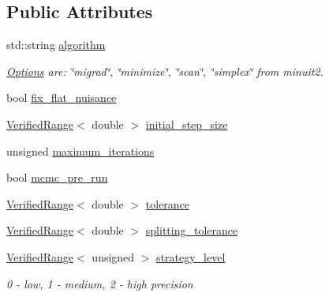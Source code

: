 \subsection*{Public Attributes}
\begin{DoxyCompactItemize}
\item 
std::string \hyperlink{structeos_1_1Analysis_1_1OptimizationOptions_a3917de66192096f736ac764b69d9acbc}{algorithm}
\begin{DoxyCompactList}\small\item\em \hyperlink{classeos_1_1Options}{Options} are: \char`\"{}migrad\char`\"{}, \char`\"{}minimize\char`\"{}, \char`\"{}scan\char`\"{}, \char`\"{}simplex\char`\"{} from minuit2. \item\end{DoxyCompactList}\item 
bool \hyperlink{structeos_1_1Analysis_1_1OptimizationOptions_abd24b29c8e1953f68dde207d8c5c48df}{fix\_\-flat\_\-nuisance}
\item 
\hyperlink{classeos_1_1VerifiedRange}{VerifiedRange}$<$ double $>$ \hyperlink{structeos_1_1Analysis_1_1OptimizationOptions_a8626041b40a908e5c1443fba86a2586b}{initial\_\-step\_\-size}
\item 
unsigned \hyperlink{structeos_1_1Analysis_1_1OptimizationOptions_aa1ec8a9c5e6325a3b090423eb76deda9}{maximum\_\-iterations}
\item 
bool \hyperlink{structeos_1_1Analysis_1_1OptimizationOptions_a6ae3c50f21c85e0c94135b4c68259c2e}{mcmc\_\-pre\_\-run}
\item 
\hyperlink{classeos_1_1VerifiedRange}{VerifiedRange}$<$ double $>$ \hyperlink{structeos_1_1Analysis_1_1OptimizationOptions_a99ab6b40de3f1bdd8218dd2028459ffe}{tolerance}
\item 
\hyperlink{classeos_1_1VerifiedRange}{VerifiedRange}$<$ double $>$ \hyperlink{structeos_1_1Analysis_1_1OptimizationOptions_a42f80d457baa1e7e325e40696d2d1bbe}{splitting\_\-tolerance}
\item 
\hyperlink{classeos_1_1VerifiedRange}{VerifiedRange}$<$ unsigned $>$ \hyperlink{structeos_1_1Analysis_1_1OptimizationOptions_ad31144d330b6897a432d0a02f1ebe027}{strategy\_\-level}
\begin{DoxyCompactList}\small\item\em 0 -\/ low, 1 -\/ medium, 2 -\/ high precision \item\end{DoxyCompactList}\end{DoxyCompactItemize}


